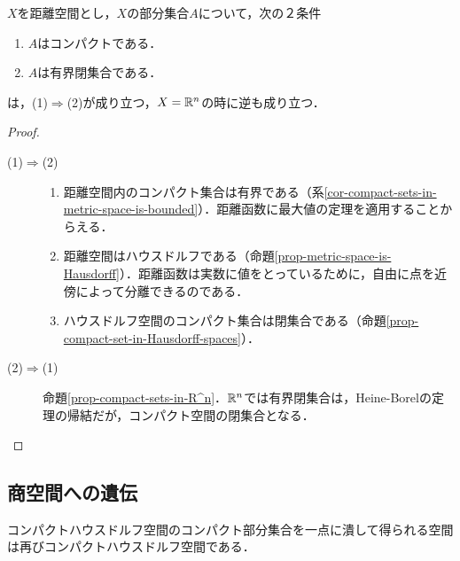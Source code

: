 \documentclass[uplatex,dvipdfmx]{jsreport}
\begin{document}
\begin{corollary}[コンパクトではない空間でのコンパクト集合]
    $X$を距離空間とし，$X$の部分集合$A$について，次の２条件
    \begin{enumerate}[(1)]
        \item $A$はコンパクトである．
        \item $A$は有界閉集合である．
    \end{enumerate}
    は，(1)$\Rightarrow$(2)が成り立つ，$X=\mathbb{R}^n$の時に逆も成り立つ．
\end{corollary}
\begin{proof}\mbox{}
    \begin{description}
        \item[(1)$\Rightarrow$(2)] 
        \begin{enumerate}
            \item 距離空間内のコンパクト集合は有界である（系\ref{cor-compact-sets-in-metric-space-is-bounded}）．距離函数に最大値の定理を適用することからえる．
            \item 距離空間はハウスドルフである（命題\ref{prop-metric-space-is-Hausdorff}）．距離函数は実数に値をとっているために，自由に点を近傍によって分離できるのである．
            \item ハウスドルフ空間のコンパクト集合は閉集合である（命題\ref{prop-compact-set-in-Hausdorff-spaces}）．
        \end{enumerate}
        \item[(2)$\Rightarrow$(1)]
        命題\ref{prop-compact-sets-in-R^n}．$\mathbb{R}^n$では有界閉集合は，Heine-Borelの定理の帰結だが，コンパクト空間の閉集合となる．
    \end{description}
\end{proof}

\subsection{商空間への遺伝}

\begin{tcolorbox}[colframe=ForestGreen, colback=ForestGreen!10!white,breakable,colbacktitle=ForestGreen!40!white,coltitle=black,fonttitle=\bfseries\sffamily,
title=]
    コンパクトハウスドルフ空間のコンパクト部分集合を一点に潰して得られる空間は再びコンパクトハウスドルフ空間である．
\end{tcolorbox}
\end{document}
